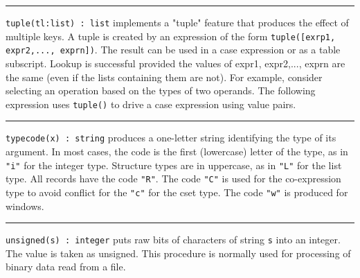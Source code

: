\vspace{0.25cm}\hrule{}

\texttt{tuple(tl:list) : list} implements a
"tuple" feature that produces the effect of
multiple keys. A tuple is created by an expression of the form
\texttt{tuple([exrp1, expr2,..., exprn])}. The result can be used in a
case expression or as a table subscript. Lookup
is successful provided the values of expr1, expr2,..., exprn are the
same (even if the lists containing them are not). For example, consider
selecting an operation based on the types of two operands. The
following expression uses \texttt{tuple()} to drive a case expression
using value pairs.


\vspace{0.25cm}\hrule{}

\texttt{typecode(x) : string} produces a one-letter string identifying
the type of its argument. In most cases, the code is the first
(lowercase) letter of the type, as in
\texttt{"i"} for the integer type.
Structure types are in uppercase, as in
\texttt{"L"} for the list type. All records
have the code \texttt{"R"}. The code
\texttt{"C"} is used for the co-expression
type to avoid conflict for the \texttt{"c"}
for the cset type. The code \texttt{"w"} is
produced for windows. 

\vspace{0.25cm}\hrule{}

\texttt{unsigned(s) : integer} puts raw bits of characters of string
\texttt{s} into an integer. The value is taken as unsigned. This
procedure is normally used for processing of binary data read from a
file.

